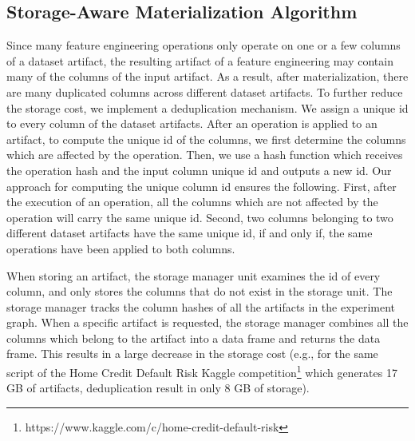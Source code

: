 \subsection{Storage-Aware Materialization Algorithm}
Since many feature engineering operations only operate on one or a few columns of a dataset artifact, the resulting artifact of a feature engineering may contain many of the columns of the input artifact.
As a result, after materialization, there are many duplicated columns across different dataset artifacts.
To further reduce the storage cost, we implement a deduplication mechanism.
We assign a unique id to every column of the dataset artifacts.
After an operation is applied to an artifact, to compute the unique id of the columns, we first determine the columns which are affected by the operation.
Then, we use a hash function which receives the operation hash and the input column unique id and outputs a new id.
Our approach for computing the unique column id ensures the following.
First, after the execution of an operation, all the columns which are not affected by the operation will carry the same unique id.
Second, two columns belonging to two different dataset artifacts have the same unique id, if and only if, the same operations have been applied to both columns.

When storing an artifact, the storage manager unit examines the id of every column, and only stores the columns that do not exist in the storage unit.
The storage manager tracks the column hashes of all the artifacts in the experiment graph.
When a specific artifact is requested, the storage manager combines all the columns which belong to the artifact into a data frame and returns the data frame.
This results in a large decrease in the storage cost (e.g., for the same script of the Home Credit Default Risk Kaggle competition\footnote{https://www.kaggle.com/c/home-credit-default-risk} which generates 17 GB of artifacts, deduplication result in only 8 GB of storage).

